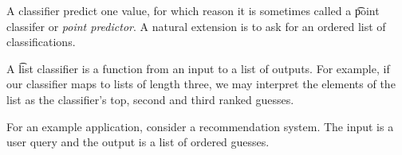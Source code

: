 
A classifier predict one value, for which reason it is sometimes called a \t{point classifer} or \textit{point predictor}.
A natural extension is to ask for an ordered list of classifications.

A \t{list classifier} is a function from an input to a list of outputs.
For example, if our classifier maps to lists of length three, we may interpret the elements of the list as the classifier's top, second and third ranked guesses.

For an example application, consider a recommendation system.
The input is a user query and the output is a list of ordered guesses.

\blankpage
